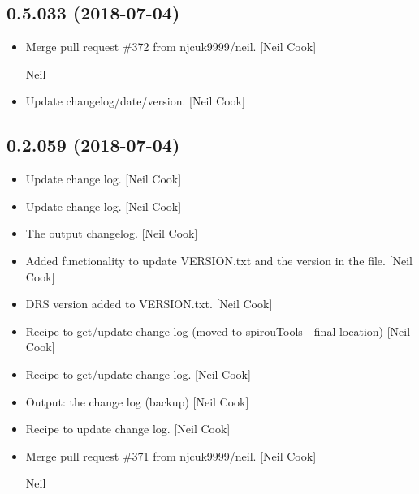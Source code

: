 \documentclass[a4paper,10pt,english]{report}
\begin{document}
\subsection{0.5.033 (2018-07-04)}
\label{\detokenize{misc/changelog:id401}}\begin{itemize}
\item {} 
Merge pull request \#372 from njcuk9999/neil. {[}Neil Cook{]}

Neil

\item {} 
Update changelog/date/version. {[}Neil Cook{]}

\end{itemize}


\subsection{0.2.059 (2018-07-04)}
\label{\detokenize{misc/changelog:id402}}\begin{itemize}
\item {} 
Update change log. {[}Neil Cook{]}

\item {} 
Update change log. {[}Neil Cook{]}

\item {} 
The output changelog. {[}Neil Cook{]}

\item {} 
Added functionality to update VERSION.txt and the version in the
 file. {[}Neil Cook{]}

\item {} 
DRS version added to VERSION.txt. {[}Neil Cook{]}

\item {} 
Recipe to get/update change log (moved to spirouTools - final
location) {[}Neil Cook{]}

\item {} 
Recipe to get/update change log. {[}Neil Cook{]}

\item {} 
Output: the change log (backup) {[}Neil Cook{]}

\item {} 
Recipe to update change log. {[}Neil Cook{]}

\item {} 
Merge pull request \#371 from njcuk9999/neil. {[}Neil Cook{]}

Neil

\end{itemize}
\end{document}
